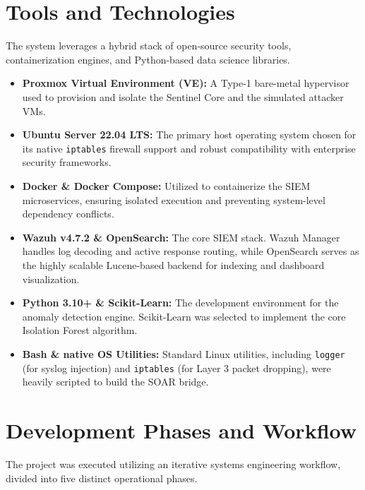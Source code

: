 \documentclass[12pt, a4paper]{report}
\begin{document}
	\section{Tools and Technologies}
	The system leverages a hybrid stack of open-source security tools, containerization engines, and Python-based data science libraries.
	
	\begin{itemize}
		\item \textbf{Proxmox Virtual Environment (VE):} A Type-1 bare-metal hypervisor used to provision and isolate the Sentinel Core and the simulated attacker VMs.
		\item \textbf{Ubuntu Server 22.04 LTS:} The primary host operating system chosen for its native \texttt{iptables} firewall support and robust compatibility with enterprise security frameworks.
		\item \textbf{Docker \& Docker Compose:} Utilized to containerize the SIEM microservices, ensuring isolated execution and preventing system-level dependency conflicts.
		\item \textbf{Wazuh v4.7.2 \& OpenSearch:} The core SIEM stack. Wazuh Manager handles log decoding and active response routing, while OpenSearch serves as the highly scalable Lucene-based backend for indexing and dashboard visualization.
		\item \textbf{Python 3.10+ \& Scikit-Learn:} The development environment for the anomaly detection engine. Scikit-Learn was selected to implement the core Isolation Forest algorithm.
		\item \textbf{Bash \& native OS Utilities:} Standard Linux utilities, including \texttt{logger} (for syslog injection) and \texttt{iptables} (for Layer 3 packet dropping), were heavily scripted to build the SOAR bridge.
	\end{itemize}
	
	\section{Development Phases and Workflow}
	The project was executed utilizing an iterative systems engineering workflow, divided into five distinct operational phases.
	
	
	
\end{document}
